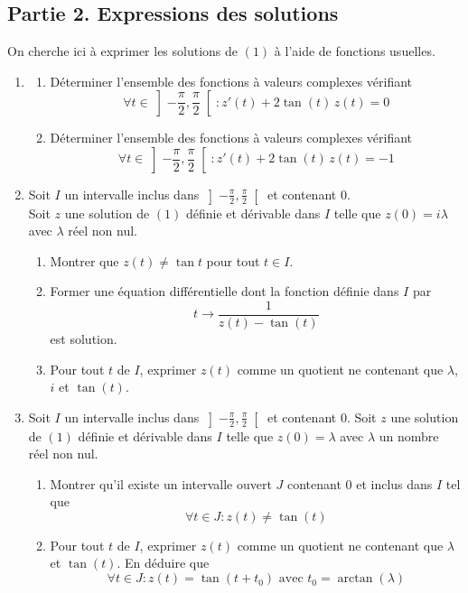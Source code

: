 \subsection*{Partie 2. Expressions des solutions}
On cherche ici à exprimer les solutions de $(1)$ à l'aide de fonctions usuelles.
\begin{enumerate}
 \item 
\begin{enumerate}
\item Déterminer l'ensemble des fonctions à valeurs complexes vérifiant
\begin{displaymath}
 \forall t\in \left] -\frac{\pi}{2} , \frac{\pi}{2}\right[ : z'(t) + 2\tan(t) \, z(t)=0
\end{displaymath}
\item Déterminer l'ensemble des fonctions à valeurs complexes vérifiant
\begin{displaymath}
 \forall t\in \left] -\frac{\pi}{2} , \frac{\pi}{2}\right[ : z'(t) + 2\tan(t) \, z(t) = -1
\end{displaymath}
\end{enumerate}

 \item Soit  $I$ un intervalle inclus dans $\left] -\frac{\pi}{2} , \frac{\pi}{2}\right[$ et contenant $0$.\\ Soit $z$ une solution de $(1)$ définie et dérivable dans $I$ telle que $z(0)=i\lambda$ avec $\lambda$ réel non nul.
\begin{enumerate}
 \item Montrer que  $z(t)\neq \tan t$ pour tout $t\in I$.
\item Former une équation différentielle dont la fonction définie dans $I$ par
\begin{displaymath}
 t \rightarrow \dfrac{1}{z(t)-\tan(t)}
\end{displaymath}
est solution.
\item Pour tout $t$ de $I$, exprimer $z(t)$ comme un quotient ne contenant que $\lambda$, $i$ et $\tan(t)$.
\end{enumerate}
\item Soit  $I$ un intervalle inclus dans $\left] -\frac{\pi}{2} , \frac{\pi}{2}\right[$ et contenant $0$. Soit $z$ une solution de $(1)$ définie et dérivable dans $I$ telle que $z(0)=\lambda$ avec $\lambda$ un nombre réel non nul.
\begin{enumerate}
 \item Montrer qu'il existe un intervalle ouvert $J$ contenant $0$ et inclus dans $I$ tel que 
\begin{displaymath}
 \forall t \in J : z(t)\neq \tan(t)
\end{displaymath}
\item Pour tout $t$ de $I$, exprimer $z(t)$ comme un quotient ne contenant que $\lambda$ et $\tan(t)$. En déduire que
\begin{displaymath}
 \forall t\in J : z(t)= \tan(t+t_0) \text{ avec } t_0 = \arctan(\lambda)
\end{displaymath}

\end{enumerate}

\end{enumerate}

